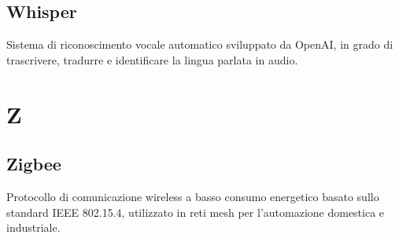 \documentclass[a4paper,11pt]{article}
\begin{document}
\subsection{Whisper}
Sistema di riconoscimento vocale automatico sviluppato da OpenAI, in grado di trascrivere, tradurre e identificare la lingua parlata in audio.

\newpage
\section{Z}

\subsection{Zigbee}
Protocollo di comunicazione wireless a basso consumo energetico basato sullo standard IEEE 802.15.4, utilizzato in reti mesh per l'automazione domestica e industriale.

\printglossaries
\end{document}
